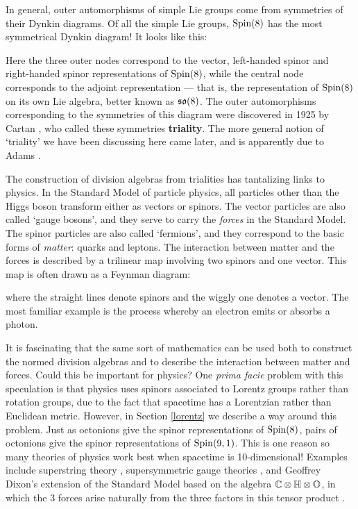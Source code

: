 In general, outer automorphisms of simple Lie groups come from
symmetries of their Dynkin diagrams.  Of all the simple Lie groups,
${\rm Spin}(8)$ has the most symmetrical Dynkin diagram!  It looks like this:

\medskip 
\centerline{\epsfysize=1.0in}   
\label{triality.figure}   
\medskip
 
\noindent   
Here the three outer nodes correspond to the vector, left-handed spinor
and right-handed spinor representations of ${\rm Spin}(8)$, while the central
node corresponds to the adjoint representation --- that is, the
representation of ${\rm Spin}(8)$ on its own Lie algebra, better known as
${\mathfrak {so}}(8)$.  The outer automorphisms corresponding to the symmetries of
this diagram were discovered in 1925 by Cartan \cite{Cartan3}, who
called these symmetries {\bf triality}.  The more general notion of
`triality' we have been discussing here came later, and is apparently
due to Adams \cite{Adams}.
 
The construction of division algebras from trialities has tantalizing 
links to physics.   In the Standard Model of particle physics, all 
particles other than the Higgs boson transform either as vectors or 
spinors.  The vector particles are also called `gauge bosons', and they
serve to carry the {\it forces} in the Standard Model.  The spinor
particles  are also called `fermions', and they correspond to the basic
forms of {\it matter}: quarks and leptons.   The interaction between
matter and the forces is described by a trilinear map involving two
spinors and one vector.  This map is often drawn as a Feynman diagram:  

\medskip
\centerline{\epsfysize=1.0in}   
\label{feynman}   
\medskip 
\noindent  
where the straight lines denote spinors and the wiggly one denotes a 
vector.  The most familiar example is the process whereby an electron 
emits or absorbs a photon.   
 
It is fascinating that the same sort of mathematics can be used both to
construct the normed division algebras and to describe the interaction
between matter and forces.  Could this be important for physics?  One
{\it prima facie} problem with this speculation is that physics uses
spinors associated to Lorentz groups rather than rotation groups, due to
the fact that spacetime has a Lorentzian rather than Euclidean metric.
However, in Section \ref{lorentz} we describe a way around this problem.
Just as octonions give the spinor representations of ${\rm Spin}(8)$, pairs
of octonions give the spinor representations of ${\rm Spin}(9,1)$.  This is
one reason so many theories of physics work best when spacetime is
10-dimensional!  Examples include superstring theory \cite{Deligne,GSW},
supersymmetric gauge theories \cite{Evans,KT,Schray}, and Geoffrey
Dixon's extension of the Standard Model based on the algebra ${\mathbb C} \otimes
{\mathbb H} \otimes {\mathbb O}$, in which the 3 forces arise naturally from the three
factors in this tensor product \cite{Dixon}.
 

